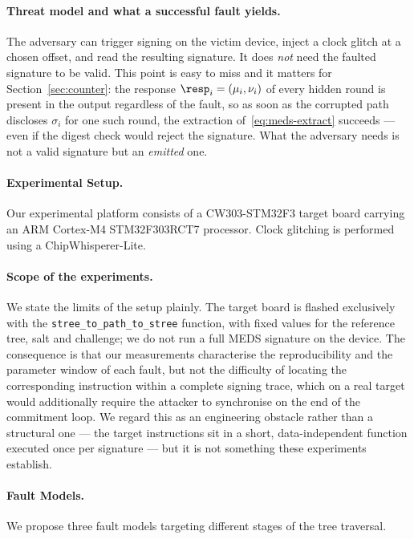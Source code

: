 \paragraph{Threat model and what a successful fault yields.}
The adversary can trigger signing on the victim device, inject a clock glitch
at a chosen offset, and read the resulting signature. It does \emph{not} need
the faulted signature to be valid. This point is easy to miss and it matters
for Section~\ref{sec:counter}: the response $\resp_i = (\mu_i,\nu_i)$ of every
hidden round is present in the output regardless of the fault, so as soon as
the corrupted path discloses $\sigma_i$ for one such round, the extraction
of~\eqref{eq:meds-extract} succeeds --- even if the digest check would reject
the signature. What the adversary needs is not a valid signature but an
\emph{emitted} one.

\paragraph{Experimental Setup.}
Our experimental platform consists of a CW303-STM32F3 target board carrying an
ARM Cortex-M4 STM32F303RCT7 processor. Clock glitching is
performed using a ChipWhisperer-Lite.

\paragraph{Scope of the experiments.}
We state the limits of the setup plainly. The target board is flashed
exclusively with the \texttt{stree\_to\_path\_to\_stree} function, with fixed
values for the reference tree, salt and challenge; we do not run a full MEDS
signature on the device. The consequence is that our measurements characterise
the reproducibility and the parameter window of each fault, but not the
difficulty of locating the corresponding instruction within a complete signing
trace, which on a real target would additionally require the attacker to
synchronise on the end of the commitment loop. We regard this as an
engineering obstacle rather than a structural one --- the target instructions
sit in a short, data-independent function executed once per signature --- but
it is not something these experiments establish.

\paragraph{Fault Models.}
We propose three fault models targeting different stages of the tree traversal.

